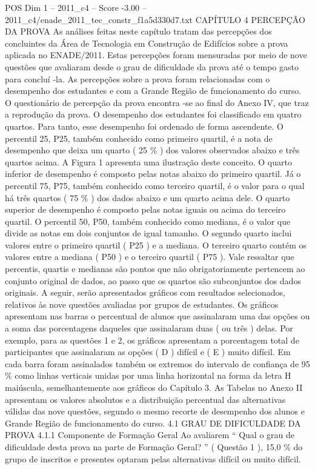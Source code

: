 \begin{textsample}{POS Dim 1 – 2011\_c4 – Score -3.00 – 2011\_c4/enade\_2011\_tec\_constr\_f1a5d330d7.txt}  \label{ex:f1_pos_325}
CAPÍTULO 4 PERCEPÇÃO DA PROVA As análises feitas neste capítulo tratam das percepções dos concluintes da Área de Tecnologia em Construção de Edifícios sobre a prova aplicada no ENADE/2011.
Estas percepções foram mensuradas por meio de nove questões que avaliaram desde o grau de dificuldade da prova até o tempo gasto para concluí -la.
As percepções sobre a prova foram relacionadas com o desempenho dos estudantes e com a Grande Região de funcionamento do curso.
O questionário de percepção da prova encontra -se ao final do Anexo IV, que traz a reprodução da prova.
O desempenho dos estudantes foi classificado em quatro quartos.
Para tanto, esse desempenho foi ordenado de forma ascendente.
O percentil 25, P25, também conhecido como primeiro quartil, é a nota de desempenho que deixa um quarto ( 25 \% ) dos valores observados abaixo e três quartos acima.
A Figura 1 apresenta uma ilustração deste conceito.
O quarto inferior de desempenho é composto pelas notas abaixo do primeiro quartil.
Já o percentil 75, P75, também conhecido como terceiro quartil, é o valor para o qual há três quartos ( 75 \% ) dos dados abaixo e um quarto acima dele.
O quarto superior de desempenho é composto pelas notas iguais ou acima do terceiro quartil.
O percentil 50, P50, também conhecido como mediana, é o valor que divide as notas em dois conjuntos de igual tamanho.
O segundo quarto inclui valores entre o primeiro quartil ( P25 ) e a mediana.
O terceiro quarto contém os valores entre a mediana ( P50 ) e o terceiro quartil ( P75 ).
Vale ressaltar que percentis, quartis e medianas são pontos que não obrigatoriamente pertencem ao conjunto original de dados, ao passo que os quartos são subconjuntos dos dados originais.
A seguir, serão apresentados gráficos com resultados selecionados, relativos às nove questões avaliadas por grupos de estudantes.
Os gráficos apresentam nas barras o percentual de alunos que assinalaram uma das opções ou a soma das porcentagens daqueles que assinalaram duas ( ou três ) delas.
Por exemplo, para as questões 1 e 2, os gráficos apresentam a porcentagem total de participantes que assinalaram as opções ( D ) difícil e ( E ) muito difícil.
Em cada barra foram assinalados também os extremos do intervalo de confiança de 95 \% como linhas verticais unidas por uma linha horizontal na forma da letra H maiúscula, semelhantemente aos gráficos do Capítulo 3.
As Tabelas no Anexo II apresentam os valores absolutos e a distribuição percentual das alternativas válidas das nove questões, segundo o mesmo recorte de desempenho dos alunos e Grande Região de funcionamento do curso. 4.1 GRAU DE DIFICULDADE DA PROVA 4.1.1 Componente de Formação Geral Ao avaliarem “ Qual o grau de dificuldade desta prova na parte de Formação Geral? ” ( Questão 1 ), 15,0 \% do grupo de inscritos e presentes optaram pelas alternativas difícil ou muito difícil.

\end{textsample}
